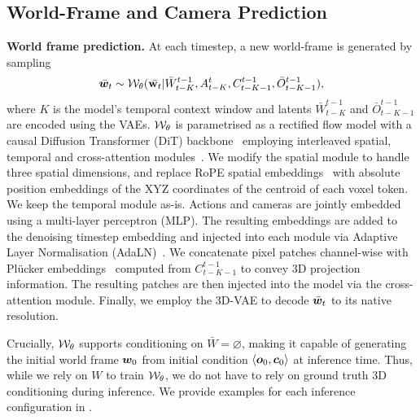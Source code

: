 \subsection{World-Frame and Camera Prediction}

\textbf{World frame prediction.} At each timestep, a new world-frame is generated by sampling 
\begin{equation}
  \bar{{\bm{w}}}_t \sim {\mathcal{W}}_\theta(\bar{{\mathbf{w}}_t} | \bar{W}^{t-1}_{t-K}, A^t_{t-K}, C^{t-1}_{t-K-1}, \bar{O}^{t-1}_{t-K-1}),  
\end{equation}
where $K$ is the model's temporal context window and latents $\bar{W}^{t-1}_{t-K}$ and $\bar{O}^{t-1}_{t-K-1}$ are encoded using the VAEs. 
${\mathcal{W}}_\theta$ is parametrised as a rectified flow model with a causal Diffusion Transformer (DiT) backbone~\citep{peebles2023scalable} employing interleaved spatial, temporal and cross-attention modules~\citep{decart2024oasis}.
We modify the spatial module to handle three spatial dimensions, and replace RoPE spatial embeddings~\citep{su2024roformer} with absolute position embeddings of the XYZ coordinates of the centroid of each voxel token.
We keep the temporal module as-is.
Actions and cameras are jointly embedded using a multi-layer perceptron (MLP).
The resulting embeddings are added to the denoising timestep embedding and injected into each module via Adaptive Layer Normalisation (AdaLN)~\citep{peebles2023scalable}. We concatenate pixel patches channel-wise with Pl\"ucker embeddings~\citep{xiao2025worldmem,sitzmann2021light} computed from $C^{t-1}_{t-K-1}$ to convey 3D projection information. The resulting patches are then injected into the model via the cross-attention module.
Finally, we employ the 3D-VAE to decode $\bar{{\bm{w}}}_t$ to its native resolution.

Crucially, ${\mathcal{W}}_\theta$ supports conditioning on $\bar{W}=\varnothing$, making it capable of generating the initial world frame ${\bm{w}}_0$ from initial condition $\langle {\bm{o}}_0, {\bm{c}}_0 \rangle$ at inference time.
Thus, while we rely on $W$ to train ${\mathcal{W}}_\theta$, we do not have to rely on ground truth 3D conditioning during inference. We provide examples for each inference configuration in .



